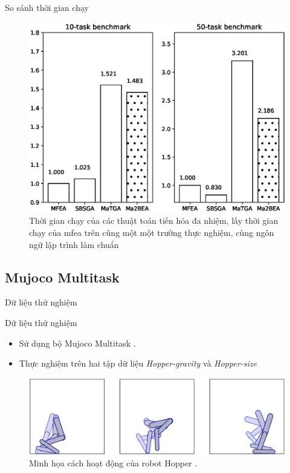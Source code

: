     \begin{frame}{So sánh thời gian chạy}
        \begin{figure}[H]
            \centering
            \includegraphics[width=0.7\linewidth]{figure/experiment/runtime.eps}
            \caption{Thời gian chạy của các thuật toán tiến hóa đa nhiệm, lấy thời gian chạy của \gls{mfea} trên cũng một một trường thực nghiệm, cùng ngôn ngữ lập trình làm chuẩn}
            \label{fig:experiment:runtime}
        \end{figure}
    \end{frame}

\subsection{Mujoco Multitask}
    \begin{frame}{Dữ liệu thử nghiệm}
        \begin{block}{Dữ liệu thử nghiệm}
            \begin{itemize}
                \item Sử dụng bộ Mujoco Multitask .
                \item Thực nghiệm trên hai tập dữ liệu \emph{Hopper-gravity} và \emph{Hopper-size}
            \end{itemize}
            \begin{figure}
                \centering
                \includegraphics[width=0.8\linewidth]{figure/experiment/hopper.png}
                \caption{Minh họa cách hoạt động của robot Hopper \cite{erez2011infinite}.}
                \label{fig:result:benchmark:hopper}
            \end{figure}
        \end{block}
    \end{frame}

